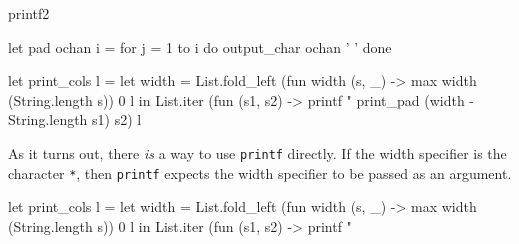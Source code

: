 \begin{exercise}{printf2}
\begin{answer}
\begin{ocaml}
let pad ochan i =
   for j = 1 to i do
      output_char ochan ' '
   done

let print_cols l =
   let width =
      List.fold_left (fun width (s, _) ->
          max width (String.length s)) 0 l
   in
      List.iter (fun (s1, s2) ->
         printf "%
            print_pad (width - String.length s1) s2) l
\end{ocaml}
%
As it turns out, there \emph{is} a way to
use \hbox{\lstinline+printf+} directly.  If the width specifier is the
character \hbox{\lstinline+*+}, then \hbox{\lstinline+printf+} expects
the width specifier to be passed as an argument.

\begin{ocaml}
let print_cols l =
   let width =
      List.fold_left (fun width (s, _) ->
          max width (String.length s)) 0 l
   in
      List.iter (fun (s1, s2) ->
         printf "%
\end{ocaml}
\fi\end{answer}
\end{exercise}


